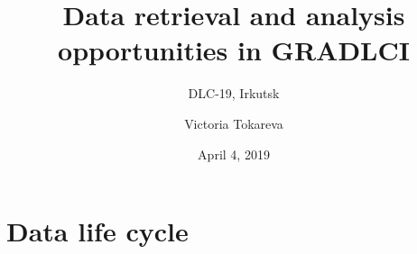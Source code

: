 \documentclass[18pt]{beamer}
\title[GRADLCI]{Data retrieval and analysis opportunities in GRADLCI}
\subtitle{DLC-19, Irkutsk}
\author[Victoria Tokareva]{
  Victoria Tokareva}
\institute{Institute for Nuclear Physics (IKP)}
\date{April 4, 2019}
\begin{document}


% 

\section{Data life cycle}







% 
\end{document}
